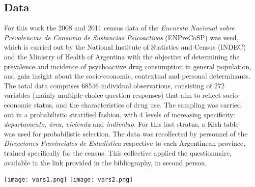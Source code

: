 \documentclass[8pt]{article}
\begin{document}
{\begin{multicols}{2}
\section{Data}
For this work the 2008 and 2011 census data of the \textit{Encuesta Nacional sobre Prevalencias de Consumo de Sustancias Psicoactivas} (ENPreCoSP) was used, which is carried out by the National Institute of Statistics and Census (INDEC) and the Ministry of Health of Argentina with the objective of determining the prevalence and incidence of psychoactive drug consumption in general population, and gain insight about the socio-economic, contextual and personal determinants. The total data comprises 68546 individual observations, consisting of 272 
variables (mainly multiple-choice question responses) that aim to reflect socio-economic status, and the characteristics of drug use. The sampling was carried out in a probabilistic stratified fashion, with 4 levels of increasing specificity: \textit{departamento, área, vivienda} and \textit{individuo}. For this last stratus, a Kish table was used for probabilistic selection. The data was recollected by personnel of the \textit{Direcciones Provinciales de Estadística} respective to each Argentinean province, trained specifically for the census. This collective applied the questionnaire, available in the link provided in the bibliography, in second person.
 
\begin{center}
	\texttt{[image: vars1.png]}
	\texttt{[image: vars2.png]}
\end{center}


\end{multicols}}
\end{document}
